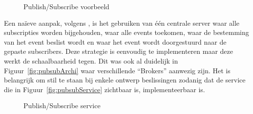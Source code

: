 \begin{figure}[!ht]
\centering
{}
\caption{Publish/Subscribe voorbeeld \citep{pietzuch2002hermes}}
\label{fig:pubsubArchi}
\end{figure}

Een naïeve aanpak, volgens \citet{carzaniga2001design}, is het gebruiken van één centrale server waar alle subscripties worden bijgehouden, waar alle events toekomen, waar de bestemming van het event beslist wordt en waar het event wordt doorgestuurd naar de gepaste subscribers.
Deze strategie is eenvoudig te implementeren maar deze werkt de schaalbaarheid tegen.
Dit was ook al duidelijk in Figuur~\vref{fig:pubsubArchi} waar verschillende ``Brokers'' aanwezig zijn.
Het is belangrijk om stil te staan bij enkele ontwerp beslissingen zodanig dat de service die in Figuur~\vref{fig:pubsubService} zichtbaar is, implementeerbaar is.

\begin{figure}[!ht]
\centering
{}
\caption{Publish/Subscribe service \citep{carzaniga2001design}}
\label{fig:pubsubService}
\end{figure}

